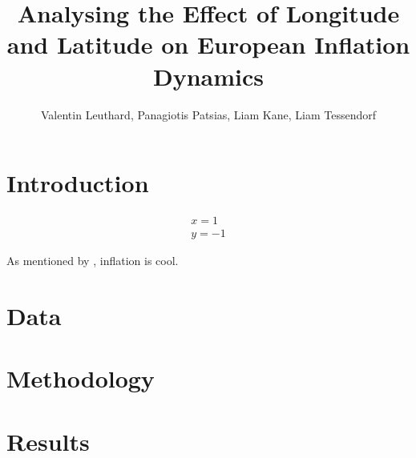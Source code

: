 \documentclass{article}
\title{Analysing the Effect of Longitude and Latitude on European Inflation Dynamics}
\author{Valentin Leuthard, Panagiotis Patsias, Liam Kane, Liam Tessendorf}
\begin{document}
    \maketitle
    \begin{abstract}
        \blindtext[2]
    \end{abstract}

    \section{Introduction}
        \begin{gather}
        x = 1 \\
        y = -1
    \end{gather}

    As mentioned by \cite{gal-2001}, inflation is cool.

    \section{Data}
    \blindtext[2]

    \section{Methodology}
    \blindtext[2]

    \section{Results}
    \blindtext[2]

    \printbibliography
\end{document}
